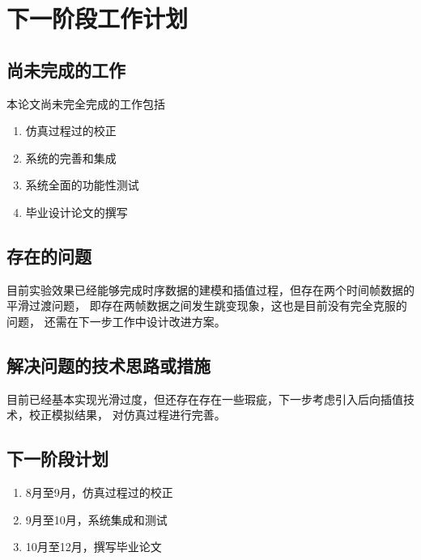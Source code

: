\chapter{下一阶段工作计划}
\label{chap:next}


\section{尚未完成的工作}
	本论文尚未完全完成的工作包括
	
\begin{enumerate}
	\item 仿真过程过的校正
	\item 系统的完善和集成
	\item 系统全面的功能性测试
	\item 毕业设计论文的撰写
\end{enumerate}
\section{存在的问题}

目前实验效果已经能够完成时序数据的建模和插值过程，但存在两个时间帧数据的平滑过渡问题，
即存在两帧数据之间发生跳变现象，这也是目前没有完全克服的问题，
还需在下一步工作中设计改进方案。

\section{解决问题的技术思路或措施}
目前已经基本实现光滑过度，但还存在存在一些瑕疵，下一步考虑引入后向插值技术，校正模拟结果，
对仿真过程进行完善。
\section{下一阶段计划}

\begin{enumerate}
	\item 8月至9月，仿真过程过的校正
	\item 9月至10月，系统集成和测试
	\item 10月至12月，撰写毕业论文	
\end{enumerate}




